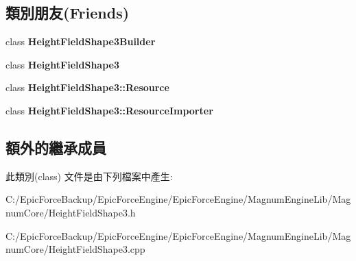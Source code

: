 \subsection*{類別朋友(Friends)}
\begin{DoxyCompactItemize}
\item 
class {\bfseries Height\+Field\+Shape3\+Builder}\hypertarget{class_magnum_1_1_height_field_shape3_1_1_resource_importer_ad601eb47f5c3430dca8c88f9dd93b2da}{}\label{class_magnum_1_1_height_field_shape3_1_1_resource_importer_ad601eb47f5c3430dca8c88f9dd93b2da}

\item 
class {\bfseries Height\+Field\+Shape3}\hypertarget{class_magnum_1_1_height_field_shape3_1_1_resource_importer_ab808f8979681967b9d908bfe30f4841b}{}\label{class_magnum_1_1_height_field_shape3_1_1_resource_importer_ab808f8979681967b9d908bfe30f4841b}

\item 
class {\bfseries Height\+Field\+Shape3\+::\+Resource}\hypertarget{class_magnum_1_1_height_field_shape3_1_1_resource_importer_a489733af8b1e9cab1ee9700c1f619014}{}\label{class_magnum_1_1_height_field_shape3_1_1_resource_importer_a489733af8b1e9cab1ee9700c1f619014}

\item 
class {\bfseries Height\+Field\+Shape3\+::\+Resource\+Importer}\hypertarget{class_magnum_1_1_height_field_shape3_1_1_resource_importer_a42ac71e9d35461ef687afa596057b1a9}{}\label{class_magnum_1_1_height_field_shape3_1_1_resource_importer_a42ac71e9d35461ef687afa596057b1a9}

\end{DoxyCompactItemize}
\subsection*{額外的繼承成員}


此類別(class) 文件是由下列檔案中產生\+:\begin{DoxyCompactItemize}
\item 
C\+:/\+Epic\+Force\+Backup/\+Epic\+Force\+Engine/\+Epic\+Force\+Engine/\+Magnum\+Engine\+Lib/\+Magnum\+Core/Height\+Field\+Shape3.\+h\item 
C\+:/\+Epic\+Force\+Backup/\+Epic\+Force\+Engine/\+Epic\+Force\+Engine/\+Magnum\+Engine\+Lib/\+Magnum\+Core/Height\+Field\+Shape3.\+cpp\end{DoxyCompactItemize}
